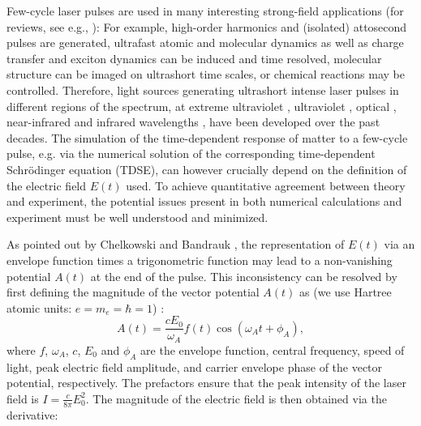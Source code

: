 Few-cycle laser pulses are used in many interesting strong-field applications (for reviews, see e.g., \cite{popmintchev2010,suzuki2014,vrakking2014,pazourek2015,wang2015,xu2016}): For example, high-order harmonics and (isolated) attosecond pulses are generated, ultrafast atomic and molecular dynamics as well as charge transfer and exciton dynamics can be induced and time resolved, molecular structure can be imaged on ultrashort time scales, or chemical reactions may be controlled. Therefore, light sources generating ultrashort intense laser pulses in different regions of the spectrum, at extreme ultraviolet \cite{goulielmakis2008}, ultraviolet \cite{durfee1999}, optical \cite{fork1987}, near-infrared \cite{zhou1994,nisoli1996,nisoli1997} and infrared wavelengths \cite{ishii2014,pupeza2015,li2016}, have been developed over the past decades.  The simulation of the time-dependent response of matter to a few-cycle pulse, e.g. via the numerical solution of the corresponding time-dependent Schr\"odinger equation (TDSE), can however crucially depend on the definition of the electric field $E(t)$ used. To achieve quantitative agreement between theory and experiment, the potential issues present in both numerical calculations and experiment must be well understood and minimized.

As pointed out by Chelkowski and Bandrauk \cite{chelkowski2002}, the representation of $E(t)$ via an envelope function times a trigonometric function may lead to a non-vanishing potential $A(t)$ at the end of the pulse. This inconsistency can be resolved by first defining the magnitude of the vector potential $A(t)$ as (we use Hartree atomic units: $e = m_e = \hbar =1$) \cite{chelkowski2002}: 
\begin{equation}
A(t) = \frac{c E_0}{\omega_A}f(t) \cos(\omega_A t +\phi_A),
\label{eq:vectorpotential}
\end{equation}
where $f$, $\omega_A$, $c$, $E_0$ and $\phi_A$ are the envelope function, central frequency, speed of light, peak electric field amplitude, and carrier envelope phase of the vector potential, respectively.
The prefactors ensure that the peak intensity of the laser field is $I = \tfrac{c}{8\pi}E_0^2$.
The magnitude of the electric field is then obtained via the derivative:

